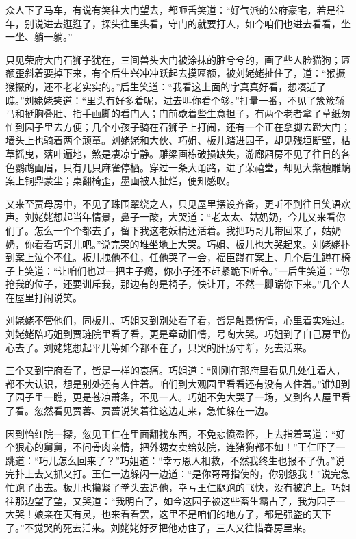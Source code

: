 \documentclass[12pt,oneside]{book}
\begin{document}
众人下了马车，有说有笑往大门望去，都咂舌笑道：“好气派的公府豪宅，若是往年，别说进去逛逛了，探头往里头看，守门的就要打人，如今咱们也进去看看，坐一坐、躺一躺。”

只见荣府大门石狮子犹在，三间兽头大门被涂抹的脏兮兮的，画了些人脸猫狗；匾额歪斜着要掉下来，有个后生兴冲冲跃起去摸匾额，被刘姥姥扯住了，道：“猴撅猴撅的，还不老老实实的。”后生笑道：“我看这上面的字真真好看，想凑近了瞧。”刘姥姥笑道：“里头有好多着呢，进去叫你看个够。”打量一番，不见了簇簇轿马和挺胸叠肚、指手画脚的看门人；门前歇着些生意担子，有两个老者拿了草纸匆忙到园子里去方便；几个小孩子骑在石狮子上打闹，还有一个正在拿脚去蹬大门；墙头上也骑着两个顽童。刘姥姥和大伙、巧姐、板儿踏进园子，却见残垣断壁，枯草摇曳，落叶遍地，煞是凄凉宁静。雕梁画栋破损缺失，游廊厢房不见了往日的各色鹦鹉画眉，只有几只麻雀停栖。穿过一条大甬路，进了荣禧堂，却见大紫檀雕螭案上铜鼎蒙尘；桌翻椅歪，墨画被人扯烂，便知感叹。

又来至贾母房中，不见了珠围翠绕之人，只见屋里摆设齐备，更听不到往日笑语欢声。刘姥姥想起当年情景，鼻子一酸，大哭道：“老太太、姑奶奶，今儿又来看你们了。怎么一个个都去了，留下我这老妖精还活着。我把巧哥儿带回来了，姑奶奶，你看看巧哥儿吧。”说完哭的堆坐地上大哭。巧姐、板儿也大哭起来。刘姥姥扑到案上泣个不住。板儿拽他不住，任他哭了一会，福臣蹲在案上、几个后生蹲在椅子上笑道：“让咱们也过一把主子瘾，你小子还不赶紧跪下听令。”一后生笑道：“你抢我的位子，还要训斥我，那边有的是椅子，快让开，不然一脚踹你下来。”几个人在屋里打闹说笑。

刘姥姥不管他们，同板儿、巧姐又到别处看了看，皆是触景伤情，心里着实难过。刘姥姥陪巧姐到贾琏院里看了看，更是牵动旧情，号啕大哭。巧姐到了自己房里伤心去了。刘姥姥想起平儿等如今都不在了，只哭的肝肠寸断，死去活来。

三个又到宁府看了，皆是一样的哀痛。巧姐道：“刚刚在那府里看见几处住着人，都不大认识，想是别处还有人住着。咱们到大观园里看看还有没有人住着。”谁知到了园子里一瞧，更是苍凉萧条，不见一人。巧姐不免大哭了一场，又到各人屋里看了看。忽然看见贾蓉、贾蔷说笑着往这边走来，急忙躲在一边。

因到怡红院一探，忽见王仁在里面翻找东西，不免悲愤盈怀，上去指着骂道：“好个狠心的舅舅，不问骨肉亲情，把外甥女卖给妓院，连猪狗都不如！”王仁吓了一跳道：“巧儿怎么回来了？”巧姐道：“幸亏恩人相救，不然我终生也报不了仇。”说完扑上去又抓又打。王仁一边躲闪一边道：“是你哥哥指使的，你别怨我！”说完急忙跑了出去。板儿也攥紧了拳头去追他，幸亏王仁腿跑的飞快，没有被追上。巧姐往那边望了望，又哭道：“我明白了，如今这园子被这些畜生霸占了，我为园子一大哭！娘亲在天有灵，也来看看罢，这里不是咱们的地方了，都是强盗的天下了。”不觉哭的死去活来。刘姥姥好歹把他劝住了，三人又往惜春房里来。
\end{document}
